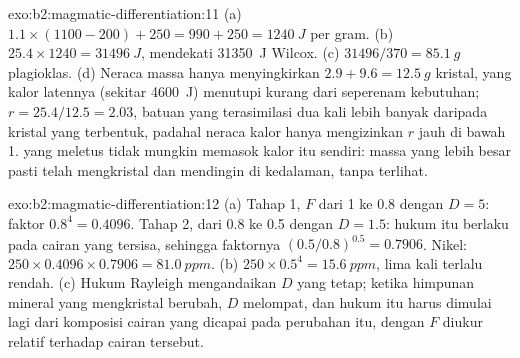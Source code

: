 \begin{solution}{exo:b2:magmatic-differentiation:11}
(a) $1.1\times(1100 - 200) + 250 = 990 + 250 = \qty{1240}{J}$ per gram. (b)
$25.4\times1240 = \qty{31496}{J}$, mendekati \qty{31350}{J} Wilcox. (c)
$31496/370 = \qty{85.1}{g}$ plagioklas. (d) Neraca massa hanya menyingkirkan $2.9 +
9.6 = \qty{12.5}{g}$ kristal, yang kalor latennya (sekitar \qty{4600}{J}) menutupi kurang
dari seperenam kebutuhan; $r = 25.4/12.5 = 2.03$, batuan yang terasimilasi dua kali lebih banyak daripada
kristal yang terbentuk, padahal neraca kalor hanya mengizinkan $r$ jauh di bawah 1.  yang meletus
tidak mungkin memasok kalor itu sendiri: massa  yang lebih besar pasti telah mengkristal
dan mendingin di kedalaman, tanpa terlihat.
\end{solution}

\begin{solution}{exo:b2:magmatic-differentiation:12}
(a) Tahap 1, $F$ dari 1 ke 0.8 dengan $D = 5$: faktor $0.8^{4} = 0.4096$. Tahap 2,
dari 0.8 ke 0.5 dengan $D = 1.5$: hukum itu berlaku pada cairan yang tersisa, sehingga
faktornya $(0.5/0.8)^{0.5} = 0.7906$. Nikel: $250\times0.4096\times0.7906 =
\qty{81.0}{ppm}$. (b) $250\times0.5^{4} = \qty{15.6}{ppm}$, lima kali terlalu rendah. (c)
Hukum Rayleigh mengandaikan $D$ yang tetap; ketika himpunan mineral yang mengkristal berubah,
$D$ melompat, dan hukum itu harus dimulai lagi dari komposisi cairan yang dicapai pada
perubahan itu, dengan $F$ diukur relatif terhadap cairan tersebut.
\end{solution}

